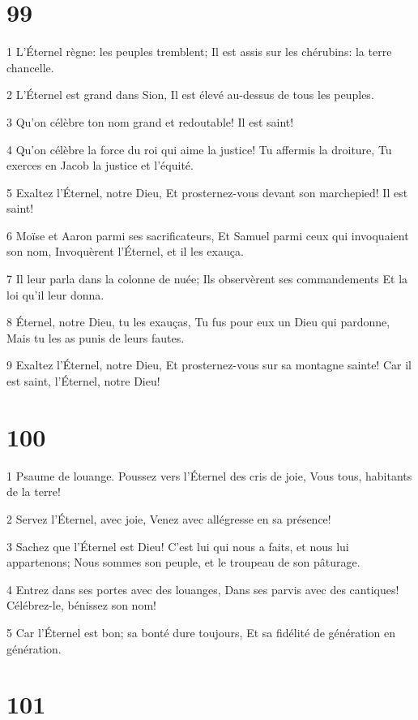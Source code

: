 \chapter{99}

\par 1 L'Éternel règne: les peuples tremblent; Il est assis sur les chérubins: la terre chancelle.
\par 2 L'Éternel est grand dans Sion, Il est élevé au-dessus de tous les peuples.
\par 3 Qu'on célèbre ton nom grand et redoutable! Il est saint!
\par 4 Qu'on célèbre la force du roi qui aime la justice! Tu affermis la droiture, Tu exerces en Jacob la justice et l'équité.
\par 5 Exaltez l'Éternel, notre Dieu, Et prosternez-vous devant son marchepied! Il est saint!
\par 6 Moïse et Aaron parmi ses sacrificateurs, Et Samuel parmi ceux qui invoquaient son nom, Invoquèrent l'Éternel, et il les exauça.
\par 7 Il leur parla dans la colonne de nuée; Ils observèrent ses commandements Et la loi qu'il leur donna.
\par 8 Éternel, notre Dieu, tu les exauças, Tu fus pour eux un Dieu qui pardonne, Mais tu les as punis de leurs fautes.
\par 9 Exaltez l'Éternel, notre Dieu, Et prosternez-vous sur sa montagne sainte! Car il est saint, l'Éternel, notre Dieu!

\chapter{100}

\par 1 Psaume de louange. Poussez vers l'Éternel des cris de joie, Vous tous, habitants de la terre!
\par 2 Servez l'Éternel, avec joie, Venez avec allégresse en sa présence!
\par 3 Sachez que l'Éternel est Dieu! C'est lui qui nous a faits, et nous lui appartenons; Nous sommes son peuple, et le troupeau de son pâturage.
\par 4 Entrez dans ses portes avec des louanges, Dans ses parvis avec des cantiques! Célébrez-le, bénissez son nom!
\par 5 Car l'Éternel est bon; sa bonté dure toujours, Et sa fidélité de génération en génération.

\chapter{101}

